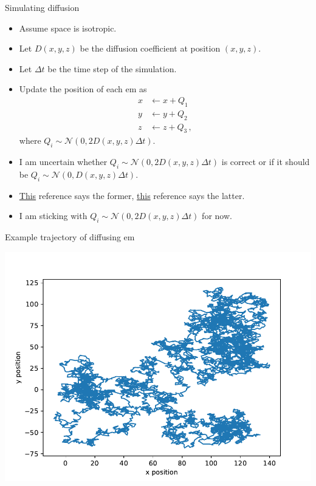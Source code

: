 \documentclass[dvipsnames]{beamer}
\begin{document}
\begin{frame}{Simulating diffusion}
\begin{itemize}
\item Assume space is isotropic.
\item Let $D(x,y,z)$ be the diffusion coefficient at position $(x,y,z)$.
\item Let $\Delta t$ be the time step of the simulation.
\item Update the position of each em as
\begin{equation*}
\begin{aligned}
x &\leftarrow x + Q_1\\
y &\leftarrow y + Q_2\\
z &\leftarrow z + Q_3\,,
\end{aligned}
\end{equation*}
where $Q_i \sim \mathcal{N}(0,2D(x,y,z)\Delta t)$.
\end{itemize}
\end{frame}

\begin{frame}
\begin{itemize}
\item I am uncertain whether $Q_i \sim \mathcal{N}(0,2D(x,y,z)\Delta t)$ is correct or if it should be $Q_i \sim \mathcal{N}(0,D(x,y,z)\Delta t)$.
\item \href{https://arxiv.org/pdf/1212.0362.pdf}{This} reference says the former, \href{https://www.intechopen.com/books/theory-and-applications-of-monte-carlo-simulations/monte-carlo-simulation-of-particle-diffusion-in-various-geometries-and-application-to-chemistry-and-}{this} reference says the latter.
\item I am sticking with $Q_i \sim \mathcal{N}(0,2D(x,y,z)\Delta t)$ for now.
\end{itemize}

\end{frame}

\begin{frame}{Example trajectory of diffusing em}
\begin{center}
\includegraphics[height=0.8\textheight]{diffusion_trajectory}
\end{center}
\end{frame}
\end{document}
